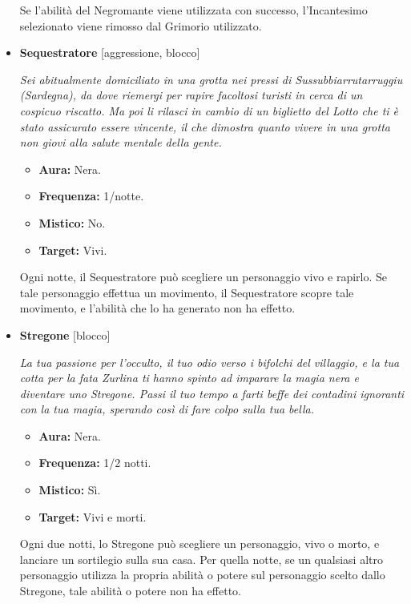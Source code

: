 \documentclass[a4paper,10pt]{article}
\begin{document}
\begin{itemize}
            Se l'abilità del Negromante viene utilizzata con successo, l'Incantesimo selezionato viene rimosso dal Grimorio utilizzato.


      \item \textbf{Sequestratore} [aggressione, blocco]

            \emph{Sei abitualmente domiciliato in una grotta nei pressi di Sussubbiarrutarruggiu (Sardegna), da dove riemergi per rapire facoltosi turisti in cerca di un cospicuo riscatto. Ma poi li rilasci in cambio di un biglietto del Lotto che ti è stato assicurato essere vincente, il che dimostra quanto vivere in una grotta non giovi alla salute mentale della gente.}

            \begin{multicols}{2}
                  \begin{itemize}
                        \item \textbf{Aura:} Nera.
                        \item \textbf{Frequenza:} 1/notte.
                        \item \textbf{Mistico:} No.
                        \item \textbf{Target:} Vivi.
                  \end{itemize}
            \end{multicols}

            Ogni notte, il Sequestratore può scegliere un personaggio vivo e rapirlo. Se tale personaggio effettua un movimento, il Sequestratore scopre tale movimento, e l'abilità che lo ha generato non ha effetto.

      \item \textbf{Stregone} [blocco]

            \emph{La tua passione per l'occulto, il tuo odio verso i bifolchi del villaggio, e la tua cotta per la fata Zurlina ti hanno spinto ad imparare la magia nera e diventare uno Stregone. Passi il tuo tempo a farti beffe dei contadini ignoranti con la tua magia, sperando così di fare colpo sulla tua bella.}

            \begin{multicols}{2}
                  \begin{itemize}
                        \item \textbf{Aura:} Nera.
                        \item \textbf{Frequenza:} 1/2 notti.
                        \item \textbf{Mistico:} Sì.
                        \item \textbf{Target:} Vivi e morti.
                  \end{itemize}
            \end{multicols}

            Ogni due notti, lo Stregone può scegliere un personaggio, vivo o morto, e lanciare un sortilegio sulla sua casa. Per quella notte, se un qualsiasi altro personaggio utilizza la propria abilità o potere sul personaggio scelto dallo Stregone, tale abilità o potere non ha effetto. %
\end{itemize}
\end{document}
